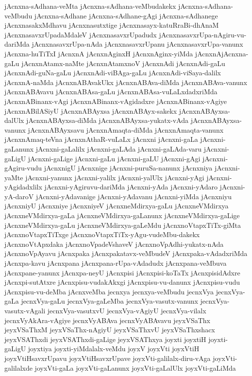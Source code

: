{jAcnxna-sAdhana-veMta
jAcnxna-sAdhana-veMbudakekx
jAcnxna-sAdhana-veMbudu
jAcnxna-sAdhane
jAcnxna-sAdhane-gAgi
jAcnxna-sAdhanege
jAcnxnasakxMdhavu
jAcnxnasutxtige
jAcnxnasayx-katuRraBi-dhAnaM
jAcnxnasavxrUpadaMdaleV
jAcnxnasavxrUpadudx
jAcnxnasavxrUpa-nAgiru-vu-dariMda
jAcnxnasavxrUpa-nAda
jAcnxnasavxrUpanu
jAcnxnasavxrUpa-vanunx
jAcnxna-huTiTxI
jAcnxnA
jAcnxnAginxH
jAcnxnAginx-yiMda
jAcnxnAjAcnxna-gaLu
jAcnxnAtamx-naMte
jAcnxnAtamxnoV
jAcnxnAdi
jAcnxnAdi-gaLu
jAcnxnAdi-guNa-gaLu
jAcnxnAdi-viBAga-gaLu
jAcnxnAdi-viSaya-dalilx
jAcnxnA-naMda
jAcnxnABAvakUkx
jAcnxnABAva-diMda
jAcnxnABAva-vanunx
jAcnxnABAvavu
jAcnxnABAsa-gaLu
jAcnxnABAsa-vuLaLxdadxriMda
jAcnxnABinanx-vAgi
jAcnxnABinanx-vAgidadxre
jAcnxnABinanx-vAgiye
jAcnxnABilASiyU
jAcnxnABAyxsa
jAcnxnABAyx-sakekx
jAcnxnABAyxsa-dalUlx
jAcnxnABAyxsa-diMda
jAcnxnABAyxsa-yukatx-vAda
jAcnxnABAyxsa-vanunx
jAcnxnABAyxsavu
jAcnxnAmaqta-diMda
jAcnxnAmaqta-vanunx
jAcnxnAmaq-teVna
jAcnxnAthaR-vuLaLx
jAcnxni
jAcnxni-gaLa
jAcnxni-gaLanunx
jAcnxni-gaLalilx
jAcnxni-gaLAda
jAcnxni-gaLAda-varu
jAcnxni-gaLigU
jAcnxni-gaLige
jAcnxni-gaLu
jAcnxni-gaLU
jAcnxni-gAgi
jAcnxni-gAgiru-vudu
jAcnxnigU
jAcnxnige
jAcnxni-puruSa-nanunx
jAcnxniya
jAcnxni-yaMte
jAcnxni-yanunx
jAcnxni-yalilx
jAcnxni-yalUlx
jAcnxni-yAgi
jAcnxni-yAgidadxlilx
jAcnxni-yAgiruvu-dariMda
jAcnxni-yAda
jAcnxni-yAdaro
jAcnxni-yA-daroV
jAcnxni-yAdavanige
jAcnxni-yAdavanu
jAcnxni-yiMda
jAcnxniyu
jAcnxniyU
jAcnxniye
jAcnxniyeV
jAcnxneMdirxya-gaLu
jAcnxneVMdirxya
jAcnxneVMdirxya-gaLa
jAcnxneVMdirxya-gaLanunx
jAcnxneVMdirxya-gaLige
jAcnxneVMdirxya-gaLu
jAcnxneVMdirxya-gaLeMdu
jAcnxnoVtapxTiTx-giMta
jAcnxnoVtapxTiTxge
jAcnxnoVtapxTiTx-yAgu-vudeMbu-dakekx
jAcnxnoVtApxdaka
jAcnxnoVpadeVshaveV
jAcnxnoVpAdhi-yukatx-nAda
jAcnxnoVpAyavu
jAcnxpaka
jAcnxpakatavx-veMbudeV
jAcnxpaka-vAdadxriMda
jAcnxpa-kavu
jAcnxpana
jAcnxpana-rUpa-vAdadudx
jAcnxpana-veMbuva
jAcnxpane-yanunx
jAcnxpa-neyU
jAcnxpisi
jAcnxpisi-koTaTx
jAcnxpisidAdxre
jAcnxpi-sutAtxre
jAcnxpisu-vudakAkxgi
jAcnxpisu-vu-danunx
jAcnxpisu-vudu
jAcnxpisu-vu-deMba
jAcnxveMba
jecnxya
jecnxya-veMbudu
jecnxVya
jecnxVya-gaLa
jecnxVya-gaLu
jecnxVya-gaLeMba
jecnxVya-vasutx-vanunx
jecnxVya-vasutx-vAgali
jecnxVya-vasutxvU
jecnxVya-vAgiyU
jecnxVya-vilalx
jecnxVyAkAra-vAgiye
jecnxVyABAva
jecnxVyABAvavu
jeyxVSaThx
jeyxVSaThxM
jeyxVSaThx-nAgiyU
jeyxVSaThxvU
jeyxVSaThxshacx
jeyxVSAThxdi
jeyxVSAThxdi-gaLige
jeyxVSAThxya
joyxti
joyxtiH
joyxti-gaLigU
joyxtiya
joyxti-yiMdalalx-veMdu
joyxV
joyxVti
joyxVtiH
joyxVtiHsavxrUpavu
joyxVtiHsavxrUpave
joyxVti-galilalx-diru-vAga
joyxVti-galilalxde
joyxVti-gaLa
joyxVti-gaLanunx
joyxVti-gaLalUlx
joyxVti-gaLiMda
}
